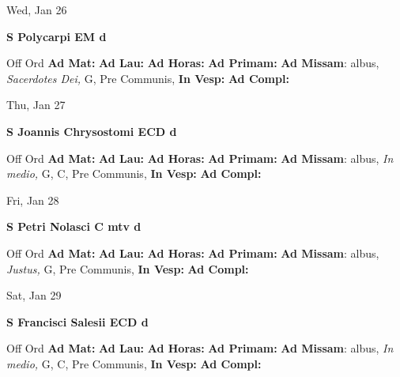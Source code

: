 \documentclass[10pt]{memoir}
\begin{document}
\begin{center}
\begin{minipage}{3.5in}
\vspace{2em}
\begin{center}Wed, Jan 26
\end{center}
\textbf{ \large S Polycarpi EM
\textnormal{\normalsize d}}

\begin{justify}Off Ord
\textbf{Ad Mat: }
\textbf{Ad Lau: }
\textbf{Ad Horas: }
\textbf{Ad Primam: }\textbf{Ad Missam}: albus, \textit{Sacerdotes Dei,} G, Pre Communis, 
\textbf{In Vesp: }
\textbf{Ad Compl: }
\end{justify}
\end{minipage}
\end{center}

\begin{center}
\begin{minipage}{3.5in}
\vspace{2em}
\begin{center}Thu, Jan 27
\end{center}
\textbf{ \large S Joannis Chrysostomi ECD
\textnormal{\normalsize d}}

\begin{justify}Off Ord
\textbf{Ad Mat: }
\textbf{Ad Lau: }
\textbf{Ad Horas: }
\textbf{Ad Primam: }\textbf{Ad Missam}: albus, \textit{In medio,} G, C, Pre Communis, 
\textbf{In Vesp: }
\textbf{Ad Compl: }
\end{justify}
\end{minipage}
\end{center}

\begin{center}
\begin{minipage}{3.5in}
\vspace{2em}
\begin{center}Fri, Jan 28
\end{center}
\textbf{ \large S Petri Nolasci C mtv
\textnormal{\normalsize d}}

\begin{justify}Off Ord
\textbf{Ad Mat: }
\textbf{Ad Lau: }
\textbf{Ad Horas: }
\textbf{Ad Primam: }\textbf{Ad Missam}: albus, \textit{Justus,} G, Pre Communis, 
\textbf{In Vesp: }
\textbf{Ad Compl: }
\end{justify}
\end{minipage}
\end{center}

\begin{center}
\begin{minipage}{3.5in}
\vspace{2em}
\begin{center}Sat, Jan 29
\end{center}
\textbf{ \large S Francisci Salesii ECD
\textnormal{\normalsize d}}

\begin{justify}Off Ord
\textbf{Ad Mat: }
\textbf{Ad Lau: }
\textbf{Ad Horas: }
\textbf{Ad Primam: }\textbf{Ad Missam}: albus, \textit{In medio,} G, C, Pre Communis, 
\textbf{In Vesp: }
\textbf{Ad Compl: }
\end{justify}
\end{minipage}
\end{center}
\end{document}
